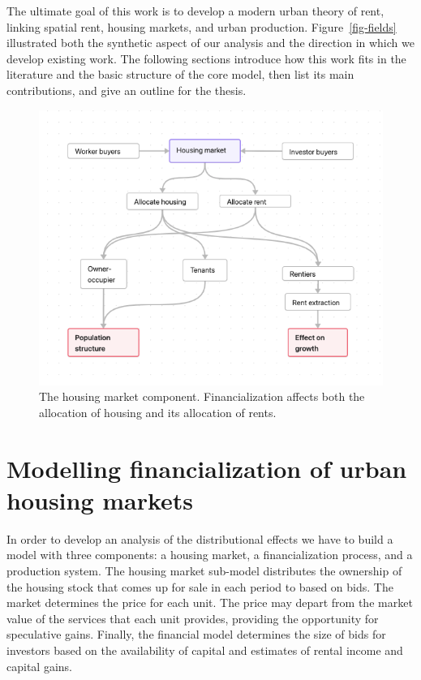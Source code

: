 The ultimate goal of this work is to develop a modern urban theory of rent, linking spatial rent, housing markets, and urban production. 
Figure~\ref{fig-fields} illustrated both the synthetic aspect of our analysis and the direction in which we develop existing work. The following sections introduce how this work fits in the literature and the basic structure of the core model, then list its main contributions, and give an outline for the thesis.

\begin{figure}[!ht]
\centering
\includegraphics[scale=.60]{fig/flow-impacts.png}
\caption[The housing market component of the model.]{The housing market component. Financialization affects both the allocation of housing and its allocation of rents.}
\label{fig-impacts}
\end{figure}


\section{Modelling financialization of urban housing markets}
In order to develop an analysis of the distributional effects we have to build a model with three components: a housing market, a financialization process, and a production system. The housing market sub-model  distributes the ownership of the housing stock that comes up for sale in each period to based on bids. %
The market determines the price for each unit. The price may depart from the market value of the services that each unit provides, providing the opportunity for speculative gains. Finally, the financial model determines the size of bids for investors based on the availability of capital and estimates of rental income and capital gains.


